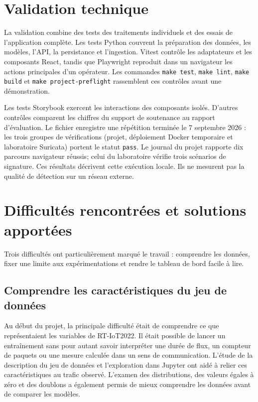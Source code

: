 \section{Validation technique}

La validation combine des tests des traitements individuels et des essais
de l'application complète. Les tests Python couvrent la préparation des données,
les mod\`eles, l'API, la persistance et l'ingestion. Vitest contr\^ole les
adaptateurs et les composants React, tandis que Playwright reproduit dans un
navigateur les actions principales d'un op\'erateur. Les commandes \texttt{make
test}, \texttt{make lint}, \texttt{make build} et \texttt{make
project-preflight} rassemblent ces contr\^oles avant une d\'emonstration.

Les tests Storybook exercent les interactions des composants isolés. D'autres
contrôles comparent les chiffres du support de soutenance au rapport d'évaluation.
Le fichier 
enregistre une répétition terminée le 7 septembre 2026 : les trois groupes de
vérifications (projet, déploiement Docker temporaire et laboratoire Suricata)
portent le statut \texttt{pass}. Le journal du projet rapporte dix parcours
navigateur réussis; celui du laboratoire vérifie trois scénarios de signature.
Ces résultats décrivent cette exécution locale. Ils ne mesurent pas la qualité
de détection sur un réseau externe.

\clearpage
\section{Difficultés rencontrées et solutions apportées}

Trois difficultés ont particulièrement marqué le travail : comprendre les
données, fixer une limite aux expérimentations et rendre le tableau de bord
facile à lire.

\subsection{Comprendre les caractéristiques du jeu de données}

Au début du projet, la principale difficulté était de comprendre ce que
représentaient les variables de RT-IoT2022. Il était possible de lancer un
entraînement sans pour autant savoir interpréter une durée de flux, un compteur
de paquets ou une mesure calculée dans un sens de communication. L'étude de la
description du jeu de données et l'exploration dans Jupyter ont aidé à relier
ces caractéristiques au trafic observé. L'examen des distributions, des valeurs
égales à zéro et des doublons a également permis de mieux comprendre les données avant
de comparer les modèles.

